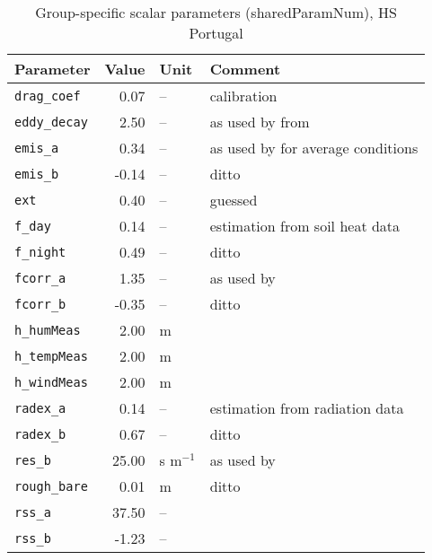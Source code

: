 \begin{table}[ht]
\centering
\caption{Group-specific scalar parameters (\textsf{sharedParamNum}), HS Portugal} 
\label{tab:portugalHS_sharedParamNum}
\begin{tabular}{lrll}
  \hline
Parameter & Value & Unit & Comment \\ 
  \hline
\verb!drag_coef! & 0.07 & -- & calibration \\ 
  \verb!eddy_decay! & 2.50 & -- & as used by \citet{shuttleworth85} from \citet{monteith73} \\ 
  \verb!emis_a! & 0.34 & -- & as used by \citet{maidment93} for average conditions \\ 
  \verb!emis_b! & -0.14 & -- & ditto \\ 
  \verb!ext! & 0.40 & -- & guessed \\ 
  \verb!f_day! & 0.14 & -- & estimation from soil heat data \\ 
  \verb!f_night! & 0.49 & -- & ditto \\ 
  \verb!fcorr_a! & 1.35 & -- & as used by \citet{maidment93} \\ 
  \verb!fcorr_b! & -0.35 & -- & ditto \\ 
  \verb!h_humMeas! & 2.00 & m &  \\ 
  \verb!h_tempMeas! & 2.00 & m &  \\ 
  \verb!h_windMeas! & 2.00 & m &  \\ 
  \verb!radex_a! & 0.14 & -- & estimation from radiation data \\ 
  \verb!radex_b! & 0.67 & -- & ditto \\ 
  \verb!res_b! & 25.00 & s m$^{-1}$ & as used by \citet{shuttleworth85} \\ 
  \verb!rough_bare! & 0.01 & m & ditto \\ 
  \verb!rss_a! & 37.50 & -- &  \\ 
  \verb!rss_b! & -1.23 & -- &  \\ 
   \hline
\end{tabular}
\end{table}
